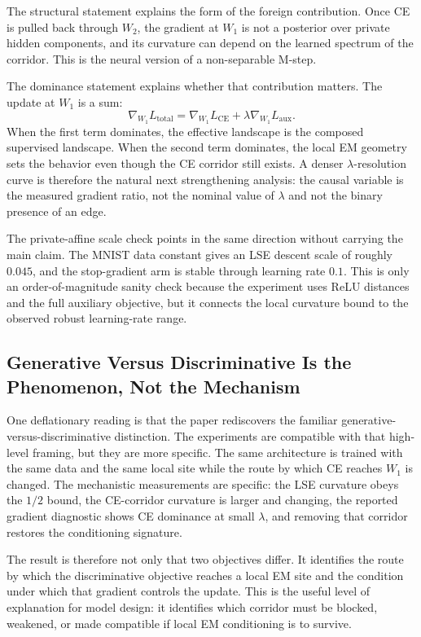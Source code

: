 The structural statement explains the form of the foreign contribution. Once
CE is pulled back through $W_2$, the gradient at $W_1$ is not a posterior over
private hidden components, and its curvature can depend on the learned
spectrum of the corridor. This is the neural version of a non-separable
M-step.

The dominance statement explains whether that contribution matters. The update
at $W_1$ is a sum:
\[
    \nabla_{W_1} L_{\mathrm{total}}
    =
    \nabla_{W_1} L_{\mathrm{CE}}
    +
    \lambda\nabla_{W_1}L_{\mathrm{aux}}.
\]
When the first term dominates, the effective landscape is the composed
supervised landscape. When the second term dominates, the local EM geometry
sets the behavior even though the CE corridor still exists. A denser
$\lambda$-resolution curve is therefore the natural next strengthening
analysis: the causal variable is the measured gradient ratio, not the nominal
value of $\lambda$ and not the binary presence of an edge.

The private-affine scale check points in the same direction without carrying
the main claim. The MNIST data constant gives an LSE descent scale of roughly
$0.045$, and the stop-gradient arm is stable through learning rate $0.1$. This
is only an order-of-magnitude sanity check because the experiment uses ReLU
distances and the full auxiliary objective, but it connects the local
curvature bound to the observed robust learning-rate range.

\subsection{Generative Versus Discriminative Is the Phenomenon, Not the
Mechanism}
One deflationary reading is that the paper rediscovers the familiar
generative-versus-discriminative distinction. The experiments are compatible
with that high-level framing, but they are more specific. The same
architecture is trained with the same data and the same local site while the
route by which CE reaches $W_1$ is changed. The mechanistic measurements are
specific: the LSE curvature obeys the $1/2$ bound, the CE-corridor curvature
is larger and changing, the reported gradient diagnostic shows CE dominance at
small $\lambda$, and removing that corridor restores the conditioning
signature.

The result is therefore not only that two objectives differ. It identifies the
route by which the discriminative objective reaches a local EM site and the
condition under which that gradient controls the update. This is the useful
level of explanation for model design: it identifies which corridor must be
blocked, weakened, or made compatible if local EM conditioning is to survive.

